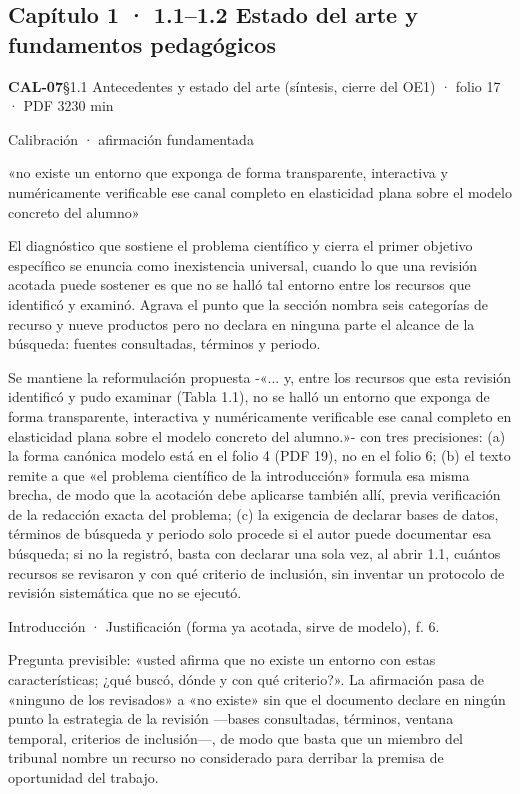 \subsection{Capítulo 1 · 1.1–1.2 Estado del arte y fundamentos pedagógicos}
\noindent\casilla\textbf{CAL-07}\quad{}\quad §1.1 Antecedentes y estado del arte (síntesis, cierre del OE1) · folio 17 · PDF 32\hfill 30 min\par\vspace{1pt}
{\small\color{gris}Calibración · afirmación fundamentada}\par
\begin{dice}«no existe un entorno que exponga de forma transparente, interactiva y numéricamente verificable ese canal completo en elasticidad plana sobre el modelo concreto del alumno»\end{dice}
{\small{}El diagnóstico que sostiene el problema científico y cierra el primer objetivo específico se enuncia como inexistencia universal, cuando lo que una revisión acotada puede sostener es que no se halló tal entorno entre los recursos que identificó y examinó. Agrava el punto que la sección nombra seis categorías de recurso y nueve productos pero no declara en ninguna parte el alcance de la búsqueda: fuentes consultadas, términos y periodo.\par}
\begin{debedecir}Se mantiene la reformulación propuesta -«... y, entre los recursos que esta revisión identificó y pudo examinar (Tabla 1.1), no se halló un entorno que exponga de forma transparente, interactiva y numéricamente verificable ese canal completo en elasticidad plana sobre el modelo concreto del alumno.»- con tres precisiones: (a) la forma canónica modelo está en el folio 4 (PDF 19), no en el folio 6; (b) el texto remite a que «el problema científico de la introducción» formula esa misma brecha, de modo que la acotación debe aplicarse también allí, previa verificación de la redacción exacta del problema; (c) la exigencia de declarar bases de datos, términos de búsqueda y periodo solo procede si el autor puede documentar esa búsqueda; si no la registró, basta con declarar una sola vez, al abrir 1.1, cuántos recursos se revisaron y con qué criterio de inclusión, sin inventar un protocolo de revisión sistemática que no se ejecutó.\end{debedecir}
{\small{}Introducción · Justificación (forma ya acotada, sirve de modelo), f. 6.\par}
{\small\color{gris}Pregunta previsible: «usted afirma que no existe un entorno con estas características; ¿qué buscó, dónde y con qué criterio?». La afirmación pasa de «ninguno de los revisados» a «no existe» sin que el documento declare en ningún punto la estrategia de la revisión —bases consultadas, términos, ventana temporal, criterios de inclusión—, de modo que basta que un miembro del tribunal nombre un recurso no considerado para derribar la premisa de oportunidad del trabajo.\par}
\vspace{6pt}
